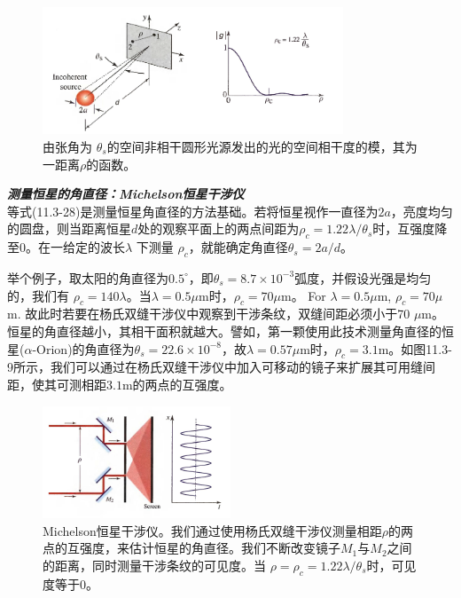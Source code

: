 \documentclass[UTF8]{ctexart}
\newcommand\crule[3][black]{\textcolor{#1}{\rule{#2}{#3}}}
\numberwithin{figure}{subsection}
\numberwithin{table}{subsection}
\newcommand\degree{^\circ}
\begin{document}
\begin{figure}[H]
\centering
\includegraphics[width=0.8\textwidth]{11_3_8.PNG}
\caption{由张角为 $\theta_s$的空间非相干圆形光源发出的光的空间相干度的模，其为一距离$\rho$的函数。}
\label{fig: 11_3_8}
\end{figure}
\noindent{\crule[ksc]{\textwidth}{0.1cm}}
\bigbreak\noindent\textcolor{ksc}{\textbf{\textsl{测量恒星的角直径：Michelson恒星干涉仪}}}\\
等式(11.3-28)是测量恒星角直径的方法基础。若将恒星视作一直径为$2a$，亮度均匀的圆盘，则当距离恒星$d$处的观察平面上的两点间距为$\rho_c = 1.22 \lambda / \theta_s$时，互强度降至0。在一给定的波长$\lambda$ 下测量 $\rho_c$，就能确定角直径$\theta_s = 2a / d$。
\par 举个例子，取太阳的角直径为$0.5\degree$，即$\theta_s = 8.7 \times 10^{-3}$弧度，并假设光强是均匀的，我们有 $\rho_c = 140\lambda$。当$\lambda = 0.5 \mu$m时，$\rho_c = 70 \mu$m。 For $\lambda = 0.5 \mu$m, $\rho_c = 70 \mu$m. 故此时若要在杨氏双缝干涉仪中观察到干涉条纹，双缝间距必须小于70 $\mu$m。恒星的角直径越小，其相干面积就越大。譬如，第一颗使用此技术测量角直径的恒星($\alpha\text{-Orion}$)的角直径为$\theta_s = 22.6\times 10^{-8}$，故$\lambda = 0.57 \mu$m时，$\rho_c = 3.1$m。如图11.3-9所示，我们可以通过在杨氏双缝干涉仪中加入可移动的镜子来扩展其可用缝间距，使其可测相距$3.1$m的两点的互强度。
\begin{figure}[H]
\centering
\includegraphics[width=0.5\textwidth]{11_3_9.PNG}
\caption{Michelson恒星干涉仪。我们通过使用杨氏双缝干涉仪测量相距$\rho$的两点的互强度，来估计恒星的角直径。我们不断改变镜子$M_1$与$M_2$之间的距离，同时测量干涉条纹的可见度。当  $\rho = \rho_c = 1.22\lambda / \theta_s$时，可见度等于0。}
\label{fig: 11_3_9}
\end{figure}
\end{document}

